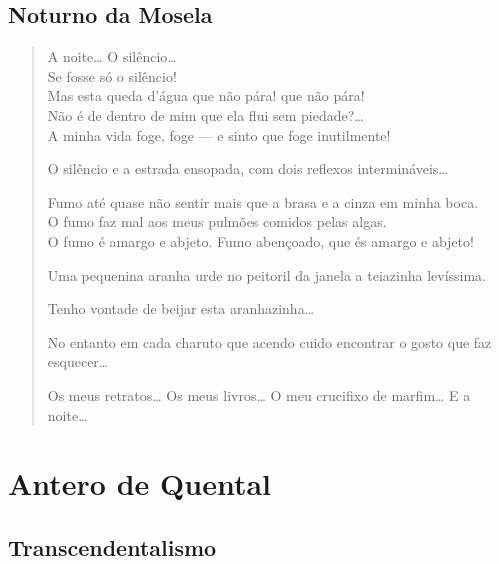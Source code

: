 \documentclass[10pt,a5paper,oneside]{book}
\begin{document}
\chapter{Noturno da Mosela}

\begin{verse}
A noite\ldots{} O silêncio\ldots{}\\
Se fosse só o silêncio!\\
Mas esta queda d'água que não pára! que não pára!\\
Não é de dentro de mim que ela flui sem piedade?\ldots{}\\
A minha vida foge, foge --- e sinto que foge inutilmente!

O silêncio e a estrada ensopada, com dois reflexos intermináveis\ldots{}

Fumo até quase não sentir mais que a brasa e a cinza em minha boca.\\
O fumo faz mal aos meus pulmões comidos pelas algas.\\
O fumo é amargo e abjeto. Fumo abençoado, que és amargo e abjeto!

Uma pequenina aranha urde no peitoril da janela a teiazinha levíssima.

Tenho vontade de beijar esta aranhazinha\ldots{}

No entanto em cada charuto que acendo cuido encontrar o gosto que faz esquecer\ldots{}

Os meus retratos\ldots{} Os meus livros\ldots{} O meu crucifixo de marfim\ldots{}
E a noite\ldots{}
\end{verse}

\part{Antero de Quental}

\chapter{Transcendentalismo}
\end{document}
